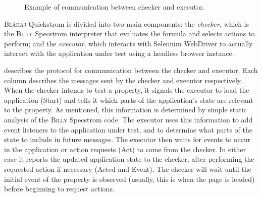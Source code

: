 \documentclass[sigplan,nonacm,10pt]{acmart}
\makeatletter
\newcommand{\Quickstrom}[0]{%
  \if@ACM@anonymous%
  \textsc{Bl\aa{}haj}%
  \else%
  Quickstrom%
  \fi\xspace}
\newcommand{\Specstrom}[0]{%
  \if@ACM@anonymous%
  \textsc{Billy}%
  \else%
  Specstrom%
  \fi\xspace}
\makeatother
\begin{document}
\begin{figure}
\caption{Example of communication between checker and executor.}
\label{fig:comms}
\end{figure}

\Quickstrom is divided into two main components: the \emph{checker}, which is the \Specstrom interpreter that evaluates the formula and selects actions to perform; and the \emph{executor}, which interacts with Selenium WebDriver to
actually interact with the application under test using a headless browser instance.

 describes the protocol for communication between the checker and executor. Each column describes the messages sent by the checker and executor respectively.
 When the checker intends to test a property, it signals the executor to load the application (\textsf{Start}) and tells it which parts of the application's state are relevant to the
property. As mentioned, this information is determined by simple static analysis of the \Specstrom code.  The executor uses this information to add event listeners to the application under test, and to determine what parts of the state to include in future messages.
The executor then waits for events to occur in the application or action requests (\textsf{Act}) to come from the checker. In either case it reports the updated application state to the checker, after performing the requested action if necessary (\textsf{Acted} and \textsf{Event}).  The checker will wait until the initial event of the property is observed (usually, this is when the page is \textsf{loaded}) before
beginning to request actions.
\end{document}
